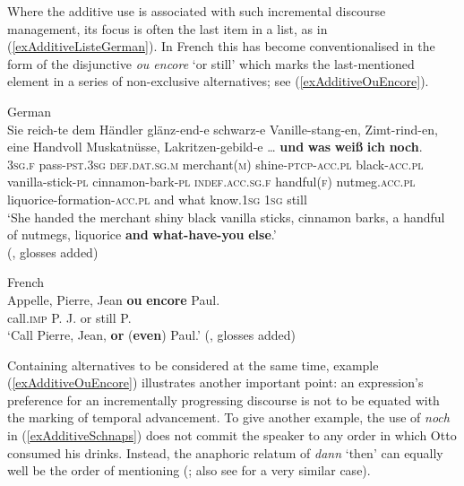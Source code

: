 Where the additive use is associated with such incremental discourse management, its focus is often the last item in a list, as in (\ref{exAdditiveListeGerman}). In French this has become conventionalised in the form of the disjunctive  \textit{ou encore} \lq or still\rq{ }which marks the last-mentioned element in a series of non-exclusive alternatives; see (\ref{exAdditiveOuEncore}).

\begin{exe}
	\ex German\label{exAdditiveListeGerman}\\
	\gll Sie reich-te dem Händler glänz-end-e schwarz-e Vanille-stang-en, Zimt-rind-en, eine Handvoll Muskatnüsse, Lakritzen-gebild-e … \textbf{und} \textbf{was} \textbf{weiß} \textbf{ich} \textbf{noch}.\\
	3\textsc{sg}.\textsc{f} pass-\textsc{pst}.3\textsc{sg} \textsc{def}.\textsc{dat}.\textsc{sg}.\textsc{m} merchant(\textsc{m}) shine-\textsc{ptcp}-\textsc{acc}.\textsc{pl} black-\textsc{acc}.\textsc{pl} vanilla-stick-\textsc{pl} cinnamon-bark-\textsc{pl} \textsc{indef}.\textsc{acc}.\textsc{sg}.\textsc{f} handful(\textsc{f}) nutmeg.\textsc{acc}.\textsc{pl} liquorice-formation-\textsc{acc}.\textsc{pl} {} and what know.1\textsc{sg} 1\textsc{sg} still\\
	\glt \lq She handed the merchant shiny black vanilla sticks, cinnamon barks, a handful of nutmegs, liquorice \textbf{and} \textbf{what-have-you} \textbf{else}.\rq{}
	\\(\cite[627]{MetrichFaucher2009}, glosses added)

 
	\ex French\label{exAdditiveOuEncore}\\
	 \gll Appelle, Pierre, Jean \textbf{ou} \textbf{encore} Paul.\\
	call.\textsc{imp} P. J. or still P.\\
	\glt \lq Call Pierre, Jean, \textbf{or} (\textbf{even}) Paul.' (\cite[40]{Borillo1984}, glosses added)
\end{exe}

Containing alternatives to be considered at the same time, example (\ref{exAdditiveOuEncore}) illustrates another important point: an expression's preference for an incrementally progressing discourse is not to be equated with the marking of temporal advancement. To give another example, the use of \textit{noch} in (\ref{exAdditiveSchnaps}) does not commit the speaker to any order in which Otto consumed his drinks. Instead, the anaphoric relatum of \textit{dann} \lq then\rq{ }can equally well be the order of mentioning (\cite{Umbach2012}; also see \cite[158]{MosegaardHansen2008} for a very similar case).

